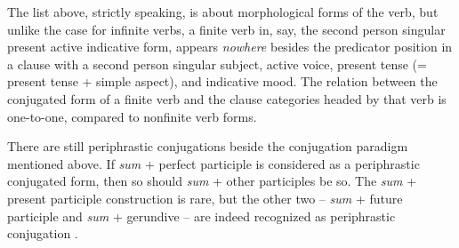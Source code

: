 \documentclass{article}
\newcommand*{\citesec}[1]{\S~{#1}}
\newcommand*{\corpus}[1]{\emph{#1}}
\begin{document}
The list above, strictly speaking, is about morphological forms of the verb,
but unlike the case for infinite verbs,
a finite verb in, say, the second person singular present active indicative form,
appears \emph{nowhere} besides the predicator position 
in a clause with a second person singular subject,
active voice,
present tense (= present tense + simple aspect),
and indicative mood.
The relation between the conjugated form of a finite verb and the clause categories headed by that verb 
is one-to-one, compared to nonfinite verb forms.

There are still periphrastic conjugations beside the conjugation paradigm mentioned above.
If \corpus{sum} + perfect participle is considered as a periphrastic conjugated form,
then so should \corpus{sum} + other participles be so.
The \corpus{sum} + present participle construction is rare,
but the other two -- 
\corpus{sum} + future participle and \corpus{sum} + gerundive
-- are indeed recognized as periphrastic conjugation \citep[\citesec{193-196}]{allen1903allen}.
\end{document}
